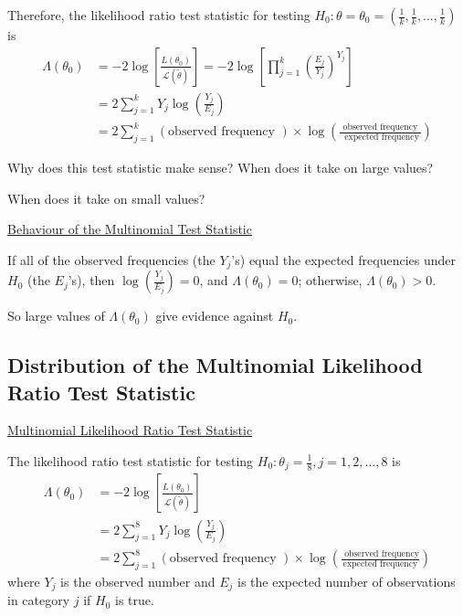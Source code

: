 \documentclass[oneside]{book}
\begin{document}
Therefore, the likelihood ratio test statistic for testing $H_{0}: \theta=\theta_{0}=\left(\frac{1}{k}, \frac{1}{k}, \ldots, \frac{1}{k}\right)$ is
\[
    \begin{aligned}
        \Lambda\left(\theta_{0}\right) & =-2 \log \left[\frac{L\left(\theta_{0}\right)}{\mathcal{L}(\tilde{\theta})}\right]=-2 \log \left[\prod_{j=1}^{k}\left(\frac{E_{j}}{Y_{j}}\right)^{Y_{j}}\right] \\
                                       & =2 \sum_{j=1}^{k} Y_{j} \log \left(\frac{Y_{j}}{E_{j}}\right)                                                                                                   \\
                                       & =2 \sum_{j=1}^{k}(\text{observed frequency }) \times \log \left(\frac{\text{ observed frequency }}{\text{ expected frequency}}\right)
    \end{aligned}
\]

Why does this test statistic make sense? When does it take on large values?

When does it take on small values?

\underline{Behaviour of the Multinomial Test Statistic}

If all of the observed frequencies (the $Y_{j}$'s) equal the expected frequencies
under $H_{0}$ (the $E_{j}$'s), then $\log \left(\frac{Y_{j}}{E_{j}}\right)=0$,
and $\Lambda\left(\theta_{0}\right)=0 $; otherwise, $ \Lambda\left(\theta_{0}\right)>0$.

So large values of $\Lambda\left(\theta_{0}\right)$ give evidence against $H_{0}$.

\subsection{Distribution of the Multinomial Likelihood Ratio Test Statistic}
\underline{Multinomial Likelihood Ratio Test Statistic}

The likelihood ratio test statistic for testing $H_{0}: \theta_{j}=\frac{1}{8}, j=1,2, \ldots, 8$ is
\[
    \begin{aligned}
        \Lambda\left(\theta_{0}\right) & =-2 \log \left[\frac{L\left(\theta_{0}\right)}{\mathcal{L}(\tilde{\theta})}\right]                \\
                                       & =2 \sum_{j=1}^{8} Y_{j} \log \left(\frac{Y_{j}}{E_{j}}\right)                                     \\
                                       & =2 \sum_{j=1}^{8}(\text{observed frequency }) \times \log \left(\frac{\text{ observed frequency}}
        {\text{expected frequency}}\right)
    \end{aligned}
\]
where $Y_{j}$ is the observed number and $E_{j}$ is the expected number of observations
in category $j$ if $H_{0}$ is true.
\end{document}
